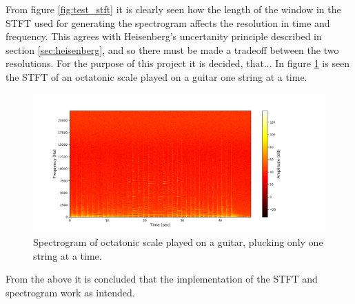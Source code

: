 From figure \ref{fig:test_stft} it is clearly seen how the length of the window in the STFT used for generating the spectrogram affects the resolution in time and frequency. This agrees with Heisenberg's uncertanity principle described in section \ref{sec:heisenberg}, and so there must be made a tradeoff between the two resolutions. For the purpose of this project it is decided, that... In figure \ref{fig:STFT_test_signal} is seen the STFT of an octatonic scale played on a guitar one string at a time.
\begin{figure}[H]
\centering
\includegraphics[width=\textwidth]{figures/validation/stft/scale.png}
\caption{Spectrogram of octatonic scale played on a guitar, plucking only one string at a time.}
\label{fig:STFT_test_signal}
\end{figure}
From the above it is concluded that the implementation of the STFT and spectrogram work as intended.
